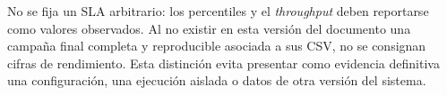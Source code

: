 No se fija un SLA arbitrario: los percentiles y el \emph{throughput} deben
reportarse como valores observados. Al no existir en esta versión del
documento una campaña final completa y reproducible asociada a sus CSV, no
se consignan cifras de rendimiento. Esta distinción evita presentar como
evidencia definitiva una configuración, una ejecución aislada o datos de
otra versión del sistema.
